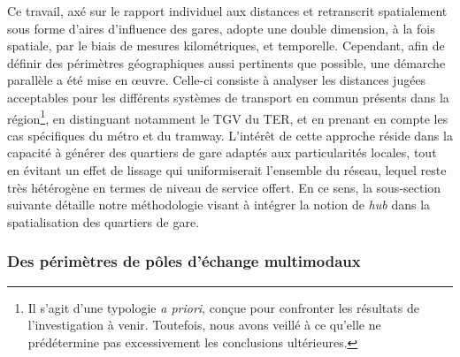 \begin{refsegment}
Ce travail, axé sur le rapport individuel aux distances et retranscrit spatialement sous forme d’aires d’influence des gares, adopte une double dimension, à la fois spatiale, par le biais de mesures kilométriques, et temporelle. Cependant, afin de définir des périmètres géographiques aussi pertinents que possible, une démarche parallèle a été mise en œuvre. Celle-ci consiste à analyser les distances jugées acceptables pour les différents systèmes de transport en commun présents dans la région\footnote{
    Il s'agit d'une typologie \textsl{a priori}, conçue pour confronter les résultats de l'investigation à venir. Toutefois, nous avons veillé à ce qu'elle ne prédétermine pas excessivement les conclusions ultérieures.
}, en distinguant notamment le \acrshort{TGV} du \acrshort{TER}, et en prenant en compte les cas spécifiques du métro et du tramway. L’intérêt de cette approche réside dans la capacité à générer des quartiers de gare adaptés aux particularités locales, tout en évitant un effet de lissage qui uniformiserait l’ensemble du réseau, lequel reste très hétérogène en termes de niveau de service offert. En ce sens, la sous-section suivante détaille notre méthodologie visant à intégrer la notion de \textsl{hub} dans la spatialisation des quartiers de gare.%

\subsubsection*{Des périmètres de pôles d'échange multimodaux
    \label{chap3:quartiers-gare-multimodaux}
    }


\end{refsegment}
